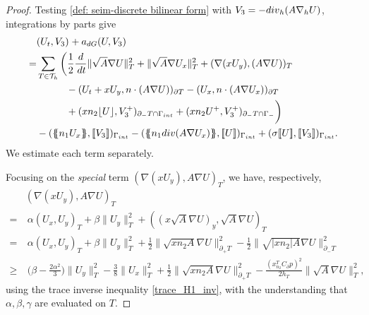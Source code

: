 \documentclass[10pt,a4paper]{amsart}
\newcommand{\Div}{{\rm div}}
\newcommand{\Th}{\mathcal{T}_h}
\newcommand{\av}[1]{\{\kern-1.2mm \{{#1}\}\kern-1.2mm\}}
\newcommand{\avg }[1]{ \av{ #1}}
\newcommand{\cinvT}{C_{\partial}}
\newcommand{\dee}{{\rm d}}
\newcommand{\dt}{\,{\rm dt}}
\newcommand{\gif}{\Gamma_-}
\newcommand{\gint}{\Gamma_{\rm int}}
\newcommand{\inner}[3]{({#1},{#2})_{{#3}}}
\newcommand{\jump}[1]{[\kern-0.6mm [{#1}]\kern-0.6mm]}
\newcommand{\jumpu}[1]{ \lfloor #1 \rfloor }
\newcommand{\norm}[2]{\|{#1}\|_{{#2}}}
\newcommand{\normal}{{n}}
\newcommand{\xn}{x_{n_2}^{T}}
\begin{document}
\begin{proof}


	Testing \eqref{def: seim-discrete bilinear form} with $V_3 = -\Div_h(A \nabla_h U)$, integrations by parts give
	\begin{equation*}\begin{split}
		&	  \inner{U_t}{V_3}{}  +    a_{\rm dG}(U,V_3)
			  \\
			    =&
			\sum_{T \in \Th} \bigg(
			\frac{1}{2} \frac{\dee}{\dt} \norm{\sqrt{A} \nabla U}{T}^2
			+
			\norm{\sqrt{A}\nabla U_x}{T}^2	+
			\inner{\nabla (x U_y)}{(A\nabla U)}{T}
			\\
			&\qquad\quad
			-
			\inner{U_t+ x U_y}{\normal \cdot (A\nabla U)}{\partial T}
			-
			\inner{U_x}{\normal \cdot (A\nabla U_x)}{\partial T}		\\
			&\qquad\quad
			+
			\inner{x\normal_2 \jumpu{U}}{ V_3^+ }{\partial_- T \cap \gint}
			+
			\inner{x\normal_2 U^+}{V_3^+}{\partial_- T \cap \gif}
			\bigg)
			\\
			&-
			\inner{\avg{\normal_1 U_x}}{\jump{ V_3}}{\gint }
			-
			\inner{\avg{\normal_1 \Div(A\nabla U_x) }}{\jump{U}}{\gint }
			+
			\inner{\sigma \jump{U}}{\jump{V_3}}{\gint }.
	\end{split}\end{equation*}
We estimate each term separately.

Focusing on the \emph{special} term $	\inner{\nabla(x U_y)}{A \nabla U}{T}$, we have, respectively,
	\begin{equation*}
		\begin{aligned}
	&	\inner{\nabla(x U_y)}{A \nabla U}{T}\\
		=&\
		 \alpha \inner{U_x}{U_y}{T}
		 +
		 \beta \norm{U_y}{T}^2
		 +
		 \inner{(x\sqrt{A} \nabla U)_y}{ \sqrt{A} \nabla U}{T}\\
		 =&\
		\alpha \inner{U_x}{U_y}{T}
		+
		\beta \norm{U_y}{T}^2
		+
		\frac{1}{2} \norm{ \sqrt{x\normal_2 A}\nabla U }{\partial_+ T}^2
		-
		\frac{1}{2} \norm{ \sqrt{|x\normal_2| A}\nabla U }{\partial_- T}^2\\
		\ge & \
	 \Big(\beta-\frac{2\alpha^2}{3}\Big)\norm{U_y}{T}^2	-	\frac{3}{8} \norm{U_x}{T} ^2+	\frac{1}{2} \norm{ \sqrt{x\normal_2 A}\nabla U }{\partial_+ T}^2
	 - \frac{(\xn\cinvT p)^2}{2h_T} \norm{\sqrt{A}\nabla U }{T}^2,
		\end{aligned}
	\end{equation*}
using the trace inverse inequality \eqref{trace_H1_inv}, with the understanding that $\alpha,\beta,\gamma$ are evaluated on $T$.



\end{proof}
\end{document}
